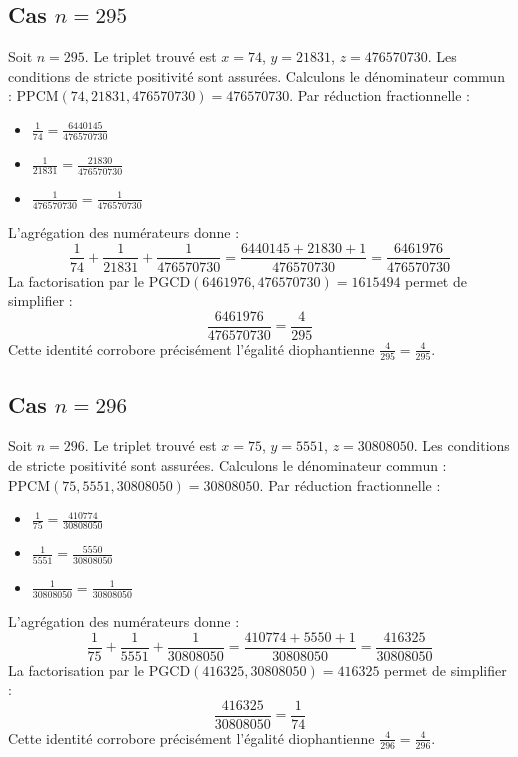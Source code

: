 \documentclass[11pt,a4paper]{article}
\begin{document}
\subsection{Cas $n = 295$}
Soit $n = 295$. Le triplet trouvé est $x = 74$, $y = 21831$, $z = 476570730$.
Les conditions de stricte positivité sont assurées.
Calculons le dénominateur commun : $\text{PPCM}(74, 21831, 476570730) = 476570730$.
Par réduction fractionnelle :
\begin{itemize}
    \item $\frac{1}{74} = \frac{6440145}{476570730}$
    \item $\frac{1}{21831} = \frac{21830}{476570730}$
    \item $\frac{1}{476570730} = \frac{1}{476570730}$
\end{itemize}
L'agrégation des numérateurs donne :
$$ \frac{1}{74} + \frac{1}{21831} + \frac{1}{476570730} = \frac{6440145 + 21830 + 1}{476570730} = \frac{6461976}{476570730} $$
La factorisation par le $\text{PGCD}(6461976, 476570730) = 1615494$ permet de simplifier :
$$ \frac{6461976}{476570730} = \frac{4}{295} $$
Cette identité corrobore précisément l'égalité diophantienne $\frac{4}{295} = \frac{4}{295}$.

\subsection{Cas $n = 296$}
Soit $n = 296$. Le triplet trouvé est $x = 75$, $y = 5551$, $z = 30808050$.
Les conditions de stricte positivité sont assurées.
Calculons le dénominateur commun : $\text{PPCM}(75, 5551, 30808050) = 30808050$.
Par réduction fractionnelle :
\begin{itemize}
    \item $\frac{1}{75} = \frac{410774}{30808050}$
    \item $\frac{1}{5551} = \frac{5550}{30808050}$
    \item $\frac{1}{30808050} = \frac{1}{30808050}$
\end{itemize}
L'agrégation des numérateurs donne :
$$ \frac{1}{75} + \frac{1}{5551} + \frac{1}{30808050} = \frac{410774 + 5550 + 1}{30808050} = \frac{416325}{30808050} $$
La factorisation par le $\text{PGCD}(416325, 30808050) = 416325$ permet de simplifier :
$$ \frac{416325}{30808050} = \frac{1}{74} $$
Cette identité corrobore précisément l'égalité diophantienne $\frac{4}{296} = \frac{4}{296}$.
\end{document}

